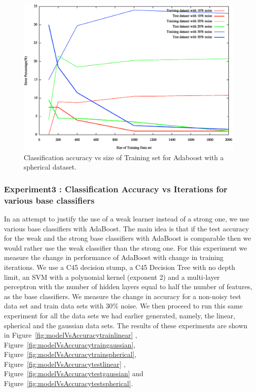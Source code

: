 \documentclass[letterpaper,11pt]{article}
\begin{document}
\begin{figure}[H]
  \centering
  \includegraphics[width=140mm]{sizeVsAccuracy-spherical.eps}
  \caption{Classification accuracy vs size of Training set for Adaboost with a spherical dataset.}
  \label{fig:sizeVsAccuracyspherical}
\end{figure}

\subsubsection{Experiment3 : Classification Accuracy vs Iterations for various base classifiers}  In an attempt to justify the use of a weak learner instead of a strong one, we use various base classifiers with AdaBoost. The main idea is that if the test accuracy for the weak and the strong base classifiers with AdaBoost is comparable then we would rather use the weak classifier than the strong one. For this experiment we measure the change in performance of AdaBoost with change in training iterations. We use a C45 decision stump, a C45 Decision Tree with no depth limit, an SVM with a polynomial kernel (exponent 2) and a multi-layer perceptron with the number of hidden layers equal to half the number of features, as the base classifiers. We measure the change in accuracy for a non-noisy test data set and train data sets with 30$\%$ noise. We then proceed to run this same experiment for all the data sets we had earlier generated, namely, the linear, spherical and the gaussian data sets. The results of these experiments are shown in Figure~\ref{fig:modelVsAccuracytrainlinear} , Figure~\ref{fig:modelVsAccuracytraingaussian}, Figure~\ref{fig:modelVsAccuracytrainspherical}, Figure~\ref{fig:modelVsAccuracytestlinear} , Figure~\ref{fig:modelVsAccuracytestgaussian} and Figure~\ref{fig:modelVsAccuracytestspherical}.
\end{document}
